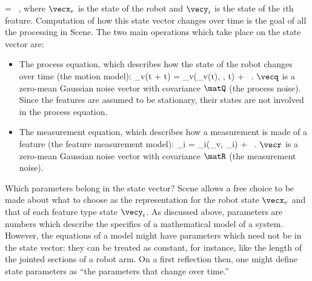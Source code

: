 \documentclass{article}
\begin{document}
\beq
\vecx = 
~, 
\eeq
where $\vecx_v$ is the state of the robot and $\vecy_i$ is the state
of the $i$th feature. Computation of how this state vector changes
over time is the goal of all the processing in Scene. The two main
operations which take place on the state vector are: 
\begin{itemize}
\item The process equation, which describes how the state of the robot
  changes over time (the motion model): \beq \vecx_v(t + \Delta t) =
  \vecf_v(\vecx_v(t), \vecu, \Delta t) + \vecq~.  \eeq $\vecq$ is a
  zero-mean Gaussian noise vector with covariance $\matQ$ (the process
  noise).  Since the features are assumed to be stationary, their
  states are not involved in the process equation.

\item The measurement equation, which describes how a measurement is
  made of a feature (the feature measurement model): \beq \vecz_i =
  \vech_i(\vecx_v, \vecy_i) + \vecr~.  \eeq $\vecr$ is a zero-mean
  Gaussian noise vector with covariance $\matR$ (the measurement
  noise).
\end{itemize}


Which parameters belong in the state vector? Scene allows a free
choice to be made about what to choose as the representation for the
robot state $\vecx_v$ and that of each feature type state
$\vecy_i$. As discussed above, parameters are numbers which describe
the specifics of a mathematical model of a system. However, the
equations of a model might have parameters which need not be in the
state vector: they can be treated as constant, for instance, like the
length of the jointed sections of a robot arm.  On a first reflection
then, one might define state parameters as ``the parameters that
change over time.''
\end{document}
